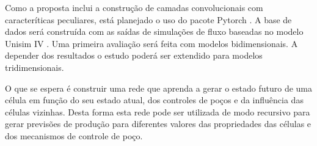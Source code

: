 \documentclass[final,5p]{elsarticle}
\numberwithin{equation}{section}
\begin{document}
    Como a proposta inclui a construção de camadas convolucionais com caracteríticas peculiares, está planejado o uso do pacote Pytorch \cite{paszke2019pytorch}. A base de dados será construída com as saídas de simulações de fluxo baseadas no modelo Unisim IV \cite{botechia2023unisim}. Uma primeira avaliação será feita com modelos bidimensionais. A depender dos resultados o estudo poderá ser extendido para modelos tridimensionais.

    O que se espera é construir uma rede que aprenda a gerar o estado futuro de uma célula em função do seu estado atual, dos controles de poços e da influência das células vizinhas. Desta forma esta rede pode ser utilizada de modo recursivo para gerar previsões de produção para diferentes valores das propriedades das células e dos mecanismos de controle de poço.










\end{document}
